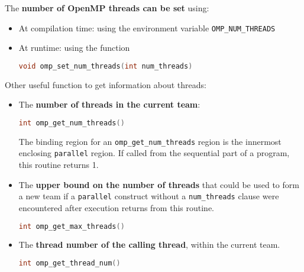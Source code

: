 \noindent
The \textbf{number of OpenMP threads can be set} using:
\begin{itemize}
    \item At compilation time: using the environment variable \texttt{OMP\_NUM\_THREADS}
    \item At runtime: using the function
    \begin{openmpbox}
        \begin{lstlisting}[language=C++]
void omp_set_num_threads(int num_threads)\end{lstlisting}
    \end{openmpbox}
\end{itemize}
Other useful function to get information about threads:
\begin{itemize}
    \item The \textbf{number of threads in the current team}:
    \begin{openmpbox}
        \begin{lstlisting}[language=C++]
int omp_get_num_threads()\end{lstlisting}
    \end{openmpbox}
    The binding region for an \texttt{omp\_get\_num\_threads} region is the innermost enclosing \texttt{parallel} region. If called from the sequential part of a program, this routine returns 1.

    \newpage

    \item The \textbf{upper bound on the number of threads} that could be used to form a new team if a \texttt{parallel} construct without a \texttt{num\_threads} clause were encountered after execution returns from this routine.
    \begin{openmpbox}
        \begin{lstlisting}[language=C++]
int omp_get_max_threads()\end{lstlisting}
    \end{openmpbox}

    \item The \textbf{thread number of the calling thread}, within the current team.
    \begin{openmpbox}
        \begin{lstlisting}[language=C++]
int omp_get_thread_num()\end{lstlisting}
    \end{openmpbox}
\end{itemize}

